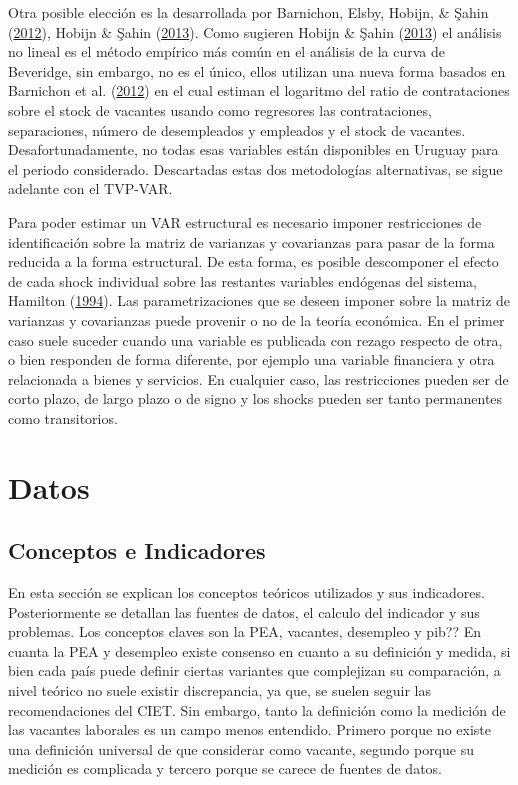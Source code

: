\documentclass[12pt,twoside]{reedthesis}
\begin{document}
Otra posible elección es la desarrollada por Barnichon, Elsby, Hobijn, \& Şahin (\protect\hyperlink{ref-Barnichon2012}{2012}), Hobijn \& Şahin (\protect\hyperlink{ref-Hobijn2013}{2013}). Como sugieren Hobijn \& Şahin (\protect\hyperlink{ref-Hobijn2013}{2013}) el análisis no lineal es el método empírico más común en el análisis de la curva de Beveridge, sin embargo, no es el único, ellos utilizan una nueva forma basados en Barnichon et al. (\protect\hyperlink{ref-Barnichon2012}{2012}) en el cual estiman el logaritmo del ratio de contrataciones sobre el stock de vacantes usando como regresores las contrataciones, separaciones, número de desempleados y empleados y el stock de vacantes. Desafortunadamente, no todas esas variables están disponibles en Uruguay para el periodo considerado. Descartadas estas dos metodologías alternativas, se sigue adelante con el TVP-VAR.

Para poder estimar un VAR estructural es necesario imponer restricciones de identificación sobre la matriz de varianzas y covarianzas para pasar de la forma reducida a la forma estructural. De esta forma, es posible descomponer el efecto de cada shock individual sobre las restantes variables endógenas del sistema, Hamilton (\protect\hyperlink{ref-Hamilton1994}{1994}). Las parametrizaciones que se deseen imponer sobre la matriz de varianzas y covarianzas puede provenir o no de la teoría económica. En el primer caso suele suceder cuando una variable es publicada con rezago respecto de otra, o bien responden de forma diferente, por ejemplo una variable financiera y otra relacionada a bienes y servicios. En cualquier caso, las restricciones pueden ser de corto plazo, de largo plazo o de signo y los shocks pueden ser tanto permanentes como transitorios.

\hypertarget{datos}{%
\chapter{Datos}\label{datos}}

\hypertarget{conceptos-e-indicadores}{%
\section{Conceptos e Indicadores}\label{conceptos-e-indicadores}}

En esta sección se explican los conceptos teóricos utilizados y sus indicadores. Posteriormente se detallan las fuentes de datos, el calculo del indicador y sus problemas. Los conceptos claves son la PEA, vacantes, desempleo y pib??
En cuanta la PEA y desempleo existe consenso en cuanto a su definición y medida, si bien cada país puede definir ciertas variantes que complejizan su comparación, a nivel teórico no suele existir discrepancia, ya que, se suelen seguir las recomendaciones del CIET.
Sin embargo, tanto la definición como la medición de las vacantes laborales es un campo menos entendido. Primero porque no existe una definición universal de que considerar como vacante, segundo porque su medición es complicada y tercero porque se carece de fuentes de datos.
\end{document}

